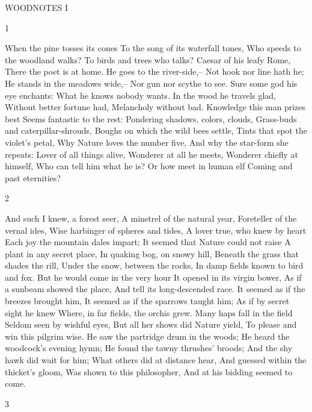 WOODNOTES I

1

When the pine tosses its cones
To the song of its waterfall tones,
Who speeds to the woodland walks?
To birds and trees who talks?
Caesar of his leafy Rome,
There the poet is at home.
He goes to the river-side,--
Not hook nor line hath he;
He stands in the meadows wide,--
Nor gun nor scythe to see.
Sure some god his eye enchants:
What he knows nobody wants.
In the wood he travels glad,
Without better fortune had,
Melancholy without bad.
Knowledge this man prizes best
Seems fantastic to the rest:
Pondering shadows, colors, clouds,
Grass-buds and caterpillar-shrouds,
Boughs on which the wild bees settle,
Tints that spot the violet's petal,
Why Nature loves the number five,
And why the star-form she repeats:
Lover of all things alive,
Wonderer at all he meets,
Wonderer chiefly at himself,
Who can tell him what he is?
Or how meet in human elf
Coming and past eternities?

2

And such I knew, a forest seer,
A minstrel of the natural year,
Foreteller of the vernal ides,
Wise harbinger of spheres and tides,
A lover true, who knew by heart
Each joy the mountain dales impart;
It seemed that Nature could not raise
A plant in any secret place,
In quaking bog, on snowy hill,
Beneath the grass that shades the rill,
Under the snow, between the rocks,
In damp fields known to bird and fox.
But he would come in the very hour
It opened in its virgin bower,
As if a sunbeam showed the place,
And tell its long-descended race.
It seemed as if the breezes brought him,
It seemed as if the sparrows taught him;
As if by secret sight he knew
Where, in far fields, the orchis grew.
Many haps fall in the field
Seldom seen by wishful eyes,
But all her shows did Nature yield,
To please and win this pilgrim wise.
He saw the partridge drum in the woods;
He heard the woodcock's evening hymn;
He found the tawny thrushes' broods;
And the shy hawk did wait for him;
What others did at distance hear,
And guessed within the thicket's gloom,
Was shown to this philosopher,
And at his bidding seemed to come.

3


